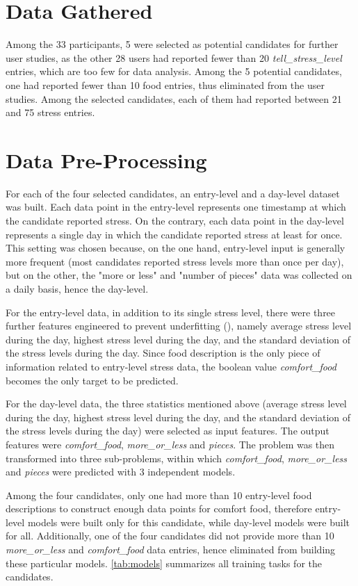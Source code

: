 \section{Data Gathered}
Among the 33 participants, 5 were selected as potential candidates for further user studies, as the other 28 users had reported fewer than 20 \emph{tell\_stress\_level} entries, which are too few for data analysis. Among the 5 potential candidates, one had reported fewer than 10 food entries, thus eliminated from the user studies. Among the selected candidates, each of them had reported between 21 and 75 stress entries.

\section{Data Pre-Processing}
For each of the four selected candidates, an entry-level and a day-level dataset was built. Each data point in the entry-level represents one timestamp at which the candidate reported stress. On the contrary, each data point in the day-level represents a single day in which the candidate reported stress at least for once. This setting was chosen because, on the one hand, entry-level input is generally more frequent (most candidates reported stress levels more than once per day), but on the other, the "more or less" and "number of pieces" data was collected on a daily basis, hence the day-level.

For the entry-level data, in addition to its single stress level, there were three further features engineered to prevent underfitting (\cite{42_underfitting}), namely average stress level during the day, highest stress level during the day, and the standard deviation of the stress levels during the day. Since food description is the only piece of information related to entry-level stress data, the boolean value \emph{comfort\_food} becomes the only target to be predicted.

For the day-level data, the three statistics mentioned above (average stress level during the day, highest stress level during the day, and the standard deviation of the stress levels during the day) were selected as input features. The output features were \emph{comfort\_food}, \emph{more\_or\_less} and \emph{pieces}. The problem was then transformed into three sub-problems, within which \emph{comfort\_food}, \emph{more\_or\_less} and \emph{pieces} were predicted with 3 independent models.

Among the four candidates, only one had more than 10 entry-level food descriptions to construct enough data points for comfort food, therefore entry-level models were built only for this candidate, while day-level models were built for all. Additionally, one of the four candidates did not provide more than 10 \emph{more\_or\_less} and \emph{comfort\_food} data entries, hence eliminated from building these particular models. \autoref{tab:models} summarizes all training tasks for the candidates.


